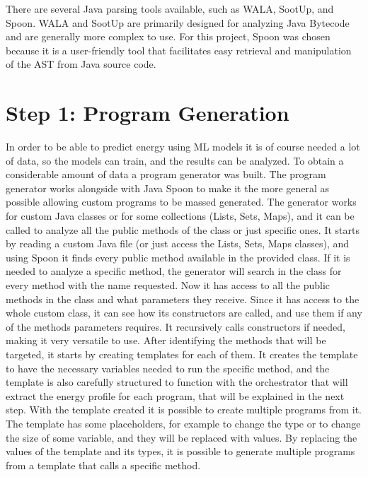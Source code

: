 There are several Java parsing tools available, such as WALA\cite{wala_main}, SootUp\cite{sootup_main}, and Spoon\cite{spoon_main}. WALA and SootUp are primarily designed for analyzing Java Bytecode and are generally more complex to use. For this project, Spoon was chosen because it is a user-friendly tool that facilitates easy retrieval and manipulation of the AST from Java source code.

\section{Step 1: Program Generation} \label{sec:work_step1_program_generation}

In order to be able to predict energy using ML models it is of course needed a lot of data, so the models can train, and the results can be analyzed. To obtain a considerable amount of data a program generator was built.
The program generator works alongside with Java Spoon to make it the more general as possible allowing custom programs to be massed generated.
The generator works for custom Java classes or for some collections (Lists, Sets, Maps), and it can be called to analyze all the public methods of the class or just specific ones.
It starts by reading a custom Java file (or just access the Lists, Sets, Maps classes), and using Spoon it finds every public method available in the provided class. If it is needed to analyze a specific method, the generator will search in the class for every method with the name requested. Now it has access to all the public methods in the class and what parameters they receive. Since it has access to the whole custom class, it can see how its constructors are called, and use them if any of the methods parameters requires. It recursively calls constructors if needed, making it very versatile to use. After identifying the methods that will be targeted, it starts by creating templates for each of them. It creates the template to have the necessary variables needed to run the specific method, and the template is also carefully structured to function with the orchestrator that will extract the energy profile for each program, that will be explained in the next step. With the template created it is possible to create multiple programs from it. The template has some placeholders, for example to change the type or to change the size of some variable, and they will be replaced with values. By replacing the values of the template and its types, it is possible to generate multiple programs from a template that calls a specific method.

